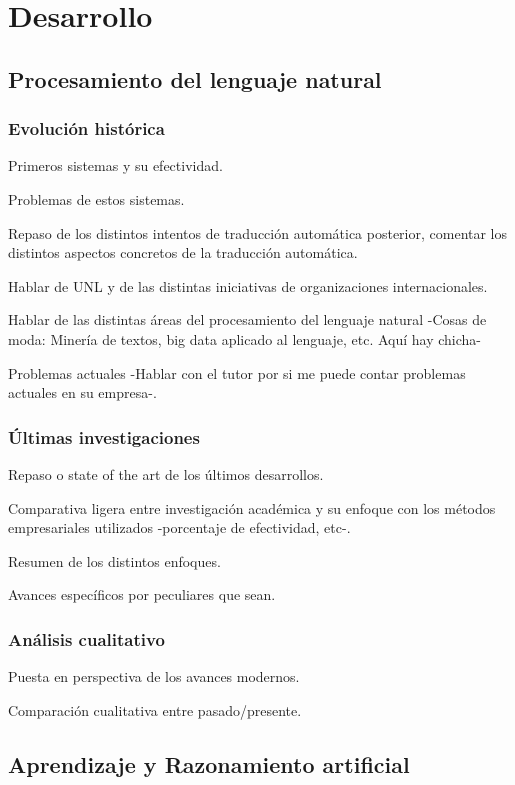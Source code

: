 \chapter{Desarrollo}
\label{chap:desarrollo}
\section{Procesamiento del lenguaje natural}

\subsection{Evolución histórica}
Primeros sistemas y su efectividad.

Problemas de estos sistemas.

Repaso de los distintos intentos de traducción automática posterior, comentar
los distintos aspectos concretos de la traducción automática.

Hablar de UNL y de las distintas iniciativas de organizaciones internacionales.

Hablar de las distintas áreas del procesamiento del lenguaje natural -Cosas de
moda: Minería de textos, big data aplicado al lenguaje, etc. Aquí hay chicha-

Problemas actuales -Hablar con el tutor por si me puede contar problemas
actuales en su empresa-.

\subsection{Últimas investigaciones}
Repaso o state of the art de los últimos desarrollos.

Comparativa ligera entre investigación académica y su enfoque con los métodos
empresariales utilizados -porcentaje de efectividad, etc-.

Resumen de los distintos enfoques.

Avances específicos por peculiares que sean.

\subsection{Análisis cualitativo}
Puesta en perspectiva de los avances modernos.

Comparación cualitativa entre pasado/presente.

\section{Aprendizaje y Razonamiento artificial}
